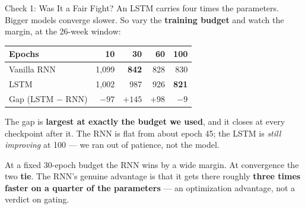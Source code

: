 \documentclass[aspectratio=169, 11pt]{beamer}
\begin{document}
\begin{frame}{Check 1: Was It a Fair Fight?}
  An LSTM carries four times the parameters. Bigger models converge slower. So vary the
  \textbf{training budget} and watch the margin, at the 26-week window:
  \begin{center}
    {\small
    \begin{tabular}{lrrrr}
      \toprule
      \textbf{Epochs} & \textbf{10} & \textbf{30} & \textbf{60} & \textbf{100} \\
      \midrule
      Vanilla RNN & 1{,}099 & \textbf{842} & 828 & 830 \\
      LSTM & 1{,}002 & 987 & 926 & \textbf{821} \\
      \midrule
      Gap (LSTM $-$ RNN) & $-97$ & $+145$ & $+98$ & $-9$ \\
      \bottomrule
    \end{tabular}
    }
  \end{center}

  \vspace{-0.1cm}
  The gap is \textbf{largest at exactly the budget we used}, and it closes at every checkpoint
  after it. The RNN is flat from about epoch 45; the LSTM is \emph{still improving} at 100 --- we
  ran out of patience, not the model.

  \begin{keybox}
    At a fixed 30-epoch budget the RNN wins by a wide margin. At convergence the two
    \textbf{tie}. The RNN's genuine advantage is that it gets there roughly \textbf{three times
    faster on a quarter of the parameters} --- an optimization advantage, not a verdict on gating.
  \end{keybox}
\end{frame}
\end{document}
